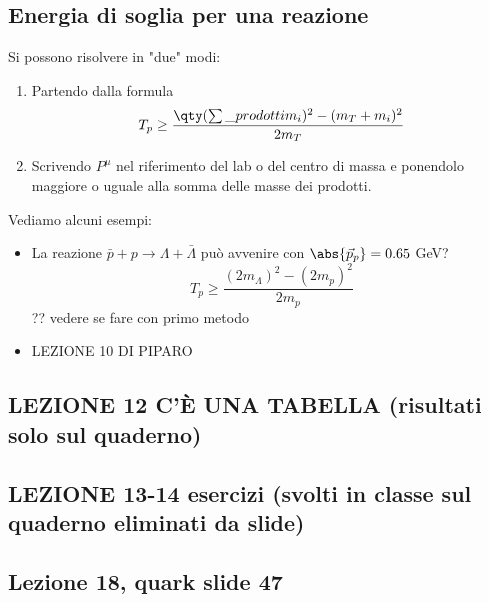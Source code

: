 \subsection{Energia di soglia per una reazione} 
Si possono risolvere in "due" modi:
\begin{enumerate}
    \item Partendo dalla formula 
    \begin{equation*}
    T_p\geq \frac {\qty(\sum\_{prodotti}m_i)^2 - (m_T+m_i)^2} {2m_T}
    \end{equation*}
    \item Scrivendo $P^\mu$ nel riferimento del lab o del centro di massa e ponendolo maggiore o uguale alla somma delle masse dei prodotti.
\end{enumerate}
Vediamo alcuni esempi:
\begin{itemize}
    \item La reazione $\bar p + p\to \Lambda+\bar\Lambda$ può avvenire con $\abs{\vec p_p}=0.65$ GeV? 
    \begin{equation*}
    T_p\geq \frac {(2m_\Lambda)^2-(2m_p)^2} {2m_p}
    \end{equation*} ?? vedere se fare con primo metodo 
    \item LEZIONE 10 DI PIPARO
\end{itemize}
\subsection{LEZIONE 12 C'È UNA TABELLA (risultati solo sul quaderno)}
\subsection{LEZIONE 13-14 esercizi (svolti in classe sul quaderno eliminati da slide)}
\subsection{Lezione 18, quark slide 47}